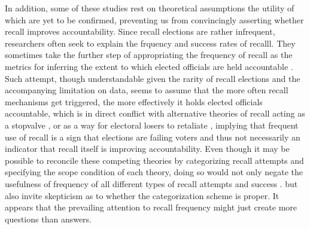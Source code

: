 \documentclass{article}
\begin{document}
		
		In addition,
		some of these studies rest on theoretical assumptions
		the utility of which are yet to be confirmed,
		preventing us from convincingly asserting
		whether recall improves accountability.
		Since recall elections are rather infrequent,
		researchers often seek to explain
		the frquency and success rates of recalll.
		They sometimes take the further step of appropriating
		the frequency of recall
		as the metrics for inferring 
		the extent to which elected officials are held accountable
		\autocite{hamanRecallElectionsTool2021,okamotoRecallJapanMeasure2020,qvortrupHastaVistaComparative2011}.
		Such attempt,
		though understandable given the rarity of recall elections and the accompanying limitation on data,
		seems to assume that the more often recall mechanisms get triggered,
		the more effectively it holds elected officials accountable,
		which is in direct conflict with
		alternative theories of recall acting as a stopvalve 
		\autocite{serdultHistoryDormantInstitution2015, welpRecallDemocraticAdvance2020},
		or as a way for electoral losers to retaliate
		\autocite{welpRecallReferendumsPeruvian2016},
		implying that frequent use of recall is a sign that elections are failing voters and thus
		not necessarily an indicator that recall itself is improving accountability.
		Even though it may be possible to reconcile these competing theories by 
		categorizing recall attempts and 
		specifying the scope condition of each theory,
		doing so would not only
		negate the usefulness of frequency of all different types of recall attempts and success .
		but also
		invite skepticism as to whether the categorization scheme is proper.
		It appears that the prevailing attention to recall frequency
		might just create more questions than answers.
		
\end{document}
